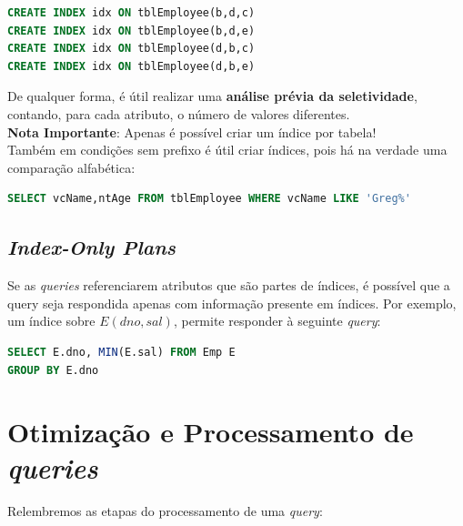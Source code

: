 \documentclass[oneside]{book}
\theoremstyle{definition}
\begin{document}
\begin{lstlisting}[language=SQL, morekeywords={CALL, DECLARE, PROCEDURE, IF}, framesep=8pt, xleftmargin=40pt, framexleftmargin=40pt, frame=tb, framerule=0pt]
CREATE INDEX idx ON tblEmployee(b,d,c)
CREATE INDEX idx ON tblEmployee(b,d,e)
CREATE INDEX idx ON tblEmployee(d,b,c)
CREATE INDEX idx ON tblEmployee(d,b,e)
\end{lstlisting}

De qualquer forma, é útil realizar uma \textbf{análise prévia da seletividade}, contando, para cada atributo, o número de valores diferentes.\\

\textbf{Nota Importante}: Apenas é possível criar um índice por tabela! \\

Também em condições sem prefixo é útil criar índices, pois há na verdade uma comparação alfabética:

\begin{lstlisting}[language=SQL, morekeywords={CALL, DECLARE, PROCEDURE, IF}, framesep=8pt, xleftmargin=40pt, framexleftmargin=40pt, frame=tb, framerule=0pt]
SELECT vcName,ntAge FROM tblEmployee WHERE vcName LIKE 'Greg%'
\end{lstlisting}

\subsection{\textit{Index-Only Plans}}

Se as \textit{queries} referenciarem atributos que são partes de índices, é possível que a query seja respondida apenas com informação presente em índices. Por exemplo, um índice sobre $E(dno, sal)$, permite responder à seguinte \textit{query}:

\begin{lstlisting}[language=SQL, morekeywords={CALL, DECLARE, PROCEDURE, IF}, framesep=8pt, xleftmargin=40pt, framexleftmargin=40pt, frame=tb, framerule=0pt]
SELECT E.dno, MIN(E.sal) FROM Emp E
GROUP BY E.dno
\end{lstlisting}

\section{Otimização e Processamento de \textit{queries}}

Relembremos as etapas do processamento de uma \textit{query}:
\end{document}
